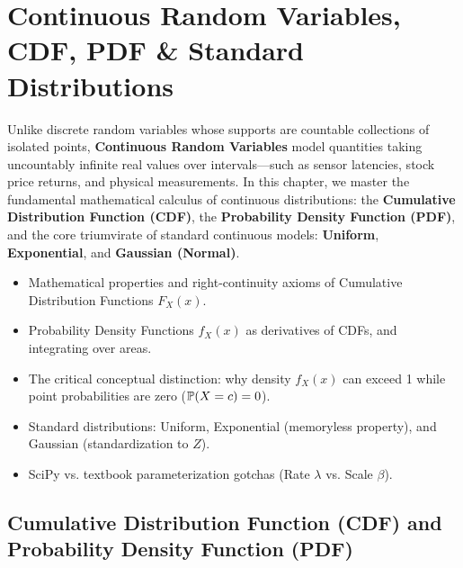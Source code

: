 \chapter{Continuous Random Variables, CDF, PDF \& Standard Distributions}

Unlike discrete random variables whose supports are countable collections of isolated points, \textbf{Continuous Random Variables} model quantities taking uncountably infinite real values over intervals---such as sensor latencies, stock price returns, and physical measurements. In this chapter, we master the fundamental mathematical calculus of continuous distributions: the \textbf{Cumulative Distribution Function (CDF)}, the \textbf{Probability Density Function (PDF)}, and the core triumvirate of standard continuous models: \textbf{Uniform}, \textbf{Exponential}, and \textbf{Gaussian (Normal)}.

\vspace{0.5cm}
\begin{tcolorbox}[colback=primarylight, colframe=primarydark, title={\textbf{What You'll Learn in this Chapter}}]
\begin{itemize}
    \item Mathematical properties and right-continuity axioms of Cumulative Distribution Functions $F_X(x)$.
    \item Probability Density Functions $f_X(x)$ as derivatives of CDFs, and integrating over areas.
    \item The critical conceptual distinction: why density $f_X(x)$ can exceed 1 while point probabilities are zero ($\P(X = c) = 0$).
    \item Standard distributions: Uniform, Exponential (memoryless property), and Gaussian (standardization to $Z$).
    \item SciPy vs. textbook parameterization gotchas (Rate $\lambda$ vs. Scale $\beta$).
\end{itemize}
\end{tcolorbox}

\section{Cumulative Distribution Function (CDF) and Probability Density Function (PDF)}

